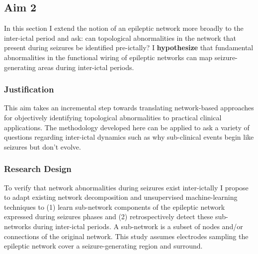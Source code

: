 \subsection{Aim 2}
\label{rsappr:aim2}
In this section I extend the notion of an epileptic network more broadly to the inter-ictal period and ask: can topological abnormalities in the network that present during seizures be identified pre-ictally? I \textbf{hypothesize} that fundamental abnormalities in the functional wiring of epileptic networks can map seizure-generating areas during inter-ictal periods.

\subsubsection{Justification}
This aim takes an incremental step towards translating network-based approaches for objectively identifying topological abnormalities to practical clinical applications. The methodology developed here can be applied to ask a variety of questions regarding inter-ictal dynamics such as why sub-clinical events begin like seizures but don't evolve.

\subsubsection{Research Design}
To verify that network abnormalities during seizures exist inter-ictally I propose to adapt existing network decomposition and unsupervised machine-learning techniques to (1) learn sub-network components of the epileptic network expressed during seizures phases and (2) retrospectively detect these sub-networks during inter-ictal periods. A sub-network is a subset of nodes and/or connections of the original network. This study assumes electrodes sampling the epileptic network cover a seizure-generating region and surround.  

